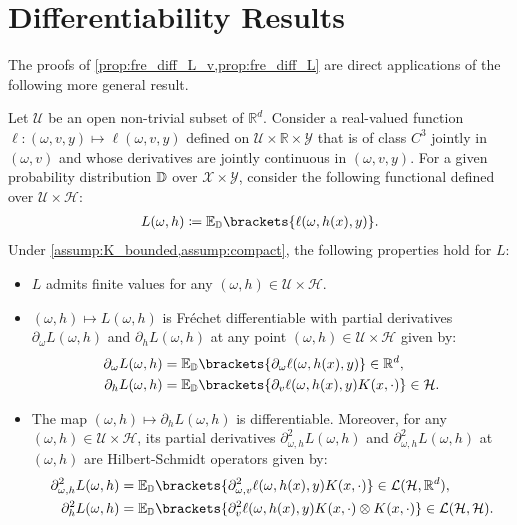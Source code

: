 \section{Differentiability Results}\label{sec:proof_diff_results}
The proofs of \cref{prop:fre_diff_L_v,prop:fre_diff_L} are direct applications of the following more general result. 
\begin{proposition}
	Let $\mathcal{U}$ be an open non-trivial subset of $\mathbb{R}^d$. 
	Consider a real-valued function $\ell: (\omega,v,y)\mapsto \ell(\omega,v,y)$ defined on $\mathcal{U}\times \mathbb{R}\times \mathcal{Y}$ that is of class $C^{3}$ jointly in $(\omega,v)$ and whose derivatives are jointly continuous in $(\omega,v,y)$. For a given  probability distribution $\mathbb{D}$ over $\mathcal{X}\times \mathcal{Y}$, consider the following functional defined over $\mathcal{U}\times\mathcal{H}$:
	\begin{align*}
		L(\omega,h) \coloneqq \mathbb{E}_{\PP}\brackets{\ell(\omega,h(x),y)}.
	\end{align*}
	Under \cref{assump:K_bounded,assump:compact}, the following properties hold for $L$:
		\begin{itemize}
			\item $L$ admits finite values for any $(\omega,h)\in \mathcal{U}\times\mathcal{H}$.
			\item $(\omega,h)\mapsto L(\omega,h)$ is Fr\'echet differentiable with partial derivatives $\partial_{\omega}L(\omega,h)$ and $\partial_{h}L(\omega,h)$ at any point $(\omega,h)\in \mathcal{U}\times \mathcal{H}$ given by:
				\begin{align*}
					\partial_{\omega}L(\omega,h) &= \mathbb{E}_{\PP}\brackets{\partial_{\omega} \ell(\omega,h(x),y)} \in \mathbb{R}^d ,\\
					\partial_{h}L(\omega,h) &= \mathbb{E}_{\PP}\brackets{\partial_v \ell(\omega,h(x),y)K(x,\cdot)}\in \mathcal{H}.
				\end{align*}
			\item The map $(\omega,h)\mapsto \partial_{h}L(\omega,h)$ is differentiable. Moreover, for any $(\omega,h)\in \mathcal{U}\times\mathcal{H}$, its partial derivatives $\partial_{\omega,h}^2L(\omega,h)$ and $\partial_{\omega,h}^2L(\omega,h)$ at $(\omega,h)$ are Hilbert-Schmidt operators given by:
				\begin{align*}
					\partial_{\omega,h}^2L(\omega,h)&= \mathbb{E}_{\PP}\brackets{\partial_{\omega,v}^2 \ell(\omega,h(x),y)K(x,\cdot)} \in \mathcal{L}(\mathcal{H},\mathbb{R}^d), \\
					\partial_{h}^2L(\omega,h) &= 
					\mathbb{E}_{\PP}\brackets{\partial_{v}^2 \ell(\omega,h(x),y)K(x,\cdot)\otimes K(x,\cdot)}\in \mathcal{L}(\mathcal{H},\mathcal{H}).
				\end{align*}
		\end{itemize}  
\end{proposition}
